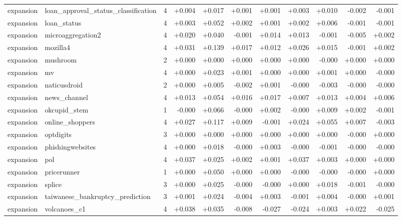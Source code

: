 \begin{longtable}{llr rrrr rrrr}
expansion & loan\_approval\_status\_classification & 4 & +0.004 & +0.017 & +0.001 & +0.001 & +0.003 & +0.010 & -0.002 & -0.001 \\
expansion & loan\_status & 4 & +0.003 & +0.052 & +0.002 & +0.001 & +0.002 & +0.006 & -0.001 & -0.001 \\
expansion & microaggregation2 & 4 & +0.020 & +0.040 & -0.001 & +0.014 & +0.013 & -0.001 & -0.005 & +0.002 \\
expansion & mozilla4 & 4 & +0.031 & +0.139 & +0.017 & +0.012 & +0.026 & +0.015 & -0.001 & +0.002 \\
expansion & mushroom & 2 & +0.000 & +0.000 & +0.000 & +0.000 & +0.000 & -0.000 & +0.000 & +0.000 \\
expansion & mv & 4 & +0.000 & +0.023 & +0.001 & +0.000 & +0.000 & +0.001 & +0.000 & -0.000 \\
expansion & naticusdroid & 2 & +0.000 & +0.005 & -0.002 & +0.001 & -0.000 & -0.003 & -0.000 & -0.000 \\
expansion & news\_channel & 4 & +0.013 & +0.054 & +0.016 & +0.017 & +0.007 & +0.013 & +0.004 & +0.006 \\
expansion & okcupid\_stem & 1 & -0.000 & +0.066 & -0.000 & +0.002 & -0.000 & +0.009 & +0.002 & -0.001 \\
expansion & online\_shoppers & 4 & +0.027 & +0.117 & +0.009 & -0.001 & +0.024 & +0.055 & +0.007 & -0.003 \\
expansion & optdigits & 3 & +0.000 & +0.000 & +0.000 & +0.000 & +0.000 & +0.000 & -0.000 & +0.000 \\
expansion & phishingwebsites & 4 & +0.000 & +0.018 & -0.000 & +0.003 & -0.000 & -0.001 & -0.000 & -0.000 \\
expansion & pol & 4 & +0.037 & +0.025 & +0.002 & +0.001 & +0.037 & +0.003 & +0.000 & +0.000 \\
expansion & pricerunner & 1 & +0.000 & +0.050 & +0.000 & +0.000 & -0.000 & -0.000 & -0.000 & +0.000 \\
expansion & splice & 3 & +0.000 & +0.025 & -0.000 & -0.000 & +0.000 & +0.018 & -0.001 & -0.000 \\
expansion & taiwanese\_bankruptcy\_prediction & 3 & +0.001 & +0.024 & -0.004 & +0.003 & -0.001 & +0.004 & -0.000 & +0.001 \\
expansion & volcanoes\_c1 & 4 & +0.038 & +0.035 & -0.008 & -0.027 & -0.024 & +0.003 & +0.022 & -0.025 \\
\end{longtable}
